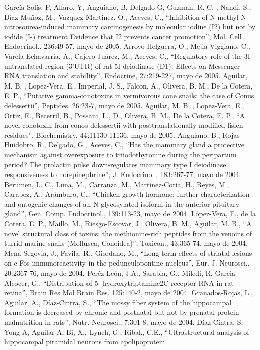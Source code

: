 García-Solís, P, Alfaro, Y, Anguiano, B, Delgado G, Guzman, R. C. , Nandi, S., Díaz-Muñoz, M., Vazquez-Martinez, O., Aceves, C., “Inhibition of 
N-methyl-N-nitrosourea-induced mammary carcinogenesis by molecular iodine (I2) but not by iodide (I-) treatment Evidence that I2 prevents cancer promotion”, 
Mol. Cell Endocrinol., 236:49-57,  mayo de 2005.
Arroyo-Helguera, O., Mejia-Viggiano, C., Varela-Echavarria, A., Cajero-Juárez, M., Aceves, C., “Regulatory role of the 3I untranslated region (3’UTR) of rat 
5I deiodinase (D1). Effects on Messenger RNA translation and stability”, Endocrine, 27:219-227,  mayo de 2005.
Aguilar, M. B. , Lopez-Vera, E., Imperial, J. S., Falcon, A., Olivera, B. M., De la Cotera, E. P., “Putative gamma-conotoxins in vermivorous cone snails: 
the case of Conus delessertii”, Peptides. 26:23-7,  mayo de 2005.
Aguilar, M. B. , Lopez-Vera, E., Ortiz, E., Becerril, B., Possani, L., D., Olivera, B. M., De la Cotera, E. P., “A novel conotoxin from conos delessertii 
with posttranslationally modified lisien residues”, Biochemistry, 44:11130-11136,  mayo de 2005.
Anguiano, B., Rojas-Huidobro, R., Delgado, G., Aceves, C., “Has the mammary gland a protective mechanism against overexposure to triiodothyronine during the 
peripartum period? The prolactin pulse down-regulates mammary type I deiodinase responsiveness to norepinephrine”, J. Endocrinol., 183:267-77,  mayo de 
2004.
Berumen, L. C., Luna, M., Carranza, M., Martinez-Coria, H., Reyes, M., Carabez, A., Arámburo, C., “Chicken growth hormone: further characterization and 
ontogenic changes of an N-glycosylated isoform in the anterior pituitary gland”, Gen. Comp. Endocrinol., 139:113-23,  mayo de 2004.
López-Vera, E., de la Cotera, E. P., Maillo, M., Riesgo-Escovar, J., Olivera, B. M., Aguilar, M. B., “A novel structural class of toxins: the 
methionine-rich peptides from the venoms of turrid marine snails (Mollusca, Conoidea)”, Toxicon., 43:365-74,  mayo de 2004.
Mena-Segovia, J., Favila, R., Giordano, M., “Long-term effects of striatal lesions on c-Fos immunoreactivity in the pedunculopontine nucleus”, Eur. J. 
Neurosci., 20:2367-76,  mayo de 2004.
Peréz-León, J.A., Sarabia, G., Miledi, R, Garcia-Alcocer, G., “Distribution of 5- hydroxytriptamine2C receptor RNA in rat retina”, Brain Res Mol Brain Res. 
125:140-2,  mayo de 2004.
Granados-Rojas, L., Aguilar, A., Díaz-Cintra, S., “The mossy fiber system of the hippocampal formation is decreased by chronic and postnatal but not by 
prenatal protein malnutrition in rats”, Nutr. Neurosci., 7:301-8,  mayo de 2004.
Díaz-Cintra, S, Yong A, Aguilar A, Bi, X., Lynch, G., Ribak, C.E., “Ultrastructural analysis of hippocampal piramidal neurons from apolipoprotein 
